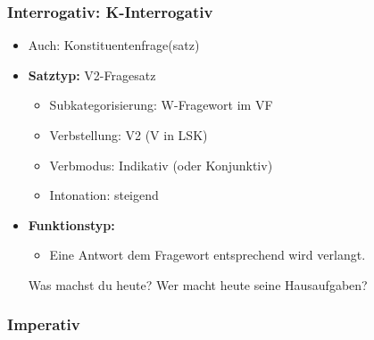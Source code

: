 \begin{frame}
\frametitle{Interrogativ: K-Interrogativ}

\begin{itemize}
	\item Auch: Konstituentenfrage(satz)
	\item \textbf{Satztyp:} V2-Fragesatz
	\begin{itemize}
		\item Subkategorisierung: W-Fragewort im VF
		\item Verbstellung: V2 (V in LSK)
		\item Verbmodus: Indikativ (oder Konjunktiv)
		\item Intonation: steigend
	\end{itemize}
	\item \textbf{Funktionstyp:}
	\begin{itemize}
		\item Eine Antwort dem Fragewort entsprechend wird verlangt.
	\end{itemize}
	
	\eal
	\ex Was machst du heute?
	\ex Wer macht heute seine Hausaufgaben?
	\zl
	
\end{itemize}

\nocite{MyP18e} \nocite{MyP18g} \nocite{MyP18i} \nocite{MyP18p}

\end{frame}


\subsubsection{Imperativ}



